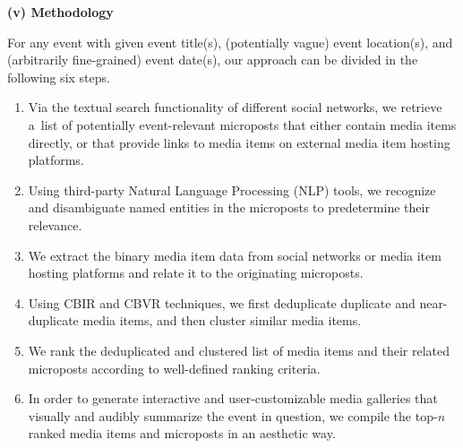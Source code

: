 \begin{abstracts}
\textbf{(v) Methodology}

For any event with given event title(s),
(potentially vague) event location(s), and
(arbitrarily fine-grained) event date(s), 
our approach can be divided in the following six steps.

\begin{enumerate}
  \item Via the textual search functionality of
        different social networks,
        we retrieve a~list of potentially event-relevant
        microposts that either contain media items directly,
        or that provide links to media items
        on external media item hosting platforms.
  \item Using third-party
        Natural Language Processing (NLP) tools,
        we recognize and disambiguate named entities
        in the microposts to predetermine their relevance.
  \item We extract the binary media item data
        from social networks or media item hosting platforms
        and relate it to the originating microposts.
  \item Using CBIR and CBVR techniques, we first deduplicate
        duplicate and near-duplicate media items,
        and then cluster similar media items.
  \item We rank the deduplicated and clustered list
        of media items and their related microposts
        according to well-defined ranking criteria.
  \item In order to generate interactive and user-customizable
        media galleries that visually and audibly summarize the
        event in question, we compile the top-$n$ ranked
        media items and microposts in an aesthetic way.
\end{enumerate}
\end{abstracts}
